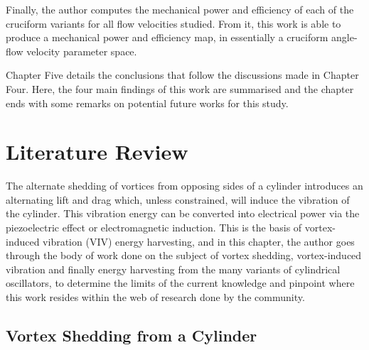 \documentclass[oneside]{utmthesis}
\begin{document}
Finally, the author computes the mechanical power and efficiency of each of the cruciform variants for all flow velocities studied. From it, this work is able to produce a mechanical power and efficiency map, in essentially a cruciform angle-flow velocity parameter space.

Chapter Five details the conclusions that follow the discussions made in Chapter Four. Here, the four main findings of this work are summarised and the chapter ends with some remarks on potential future works for this study.

\chapter{Literature Review} \label{chap:literatureReview}
The alternate shedding of vortices from opposing sides of a cylinder introduces an alternating lift and drag which, unless constrained, will induce the vibration of the cylinder. This vibration energy can be converted into electrical power via the piezoelectric effect or electromagnetic induction. This is the basis of vortex-induced vibration (VIV) energy harvesting, and in this chapter, the author goes through the body of work done on the subject of vortex shedding, vortex-induced vibration and finally energy harvesting from the many variants of cylindrical oscillators, to determine the limits of the current knowledge and pinpoint where this work resides within the web of research done by the community.

\section{Vortex Shedding from a Cylinder}

\vspace{\baselineskip}

\end{document}
